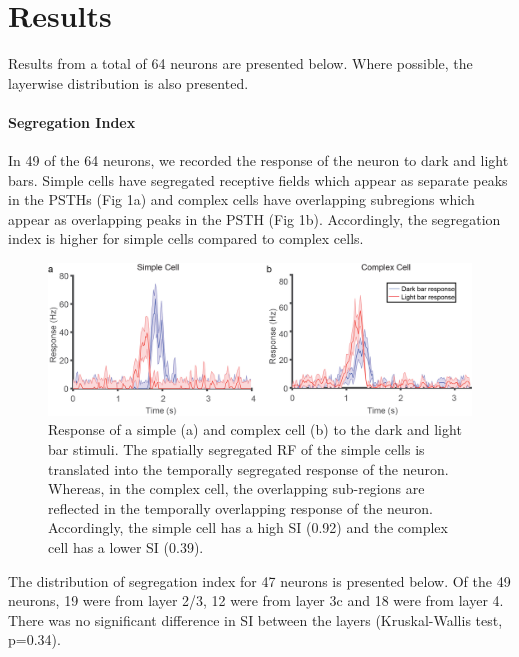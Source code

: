					

	\section{Results}
	
		Results from a total of 64 neurons are presented below. Where possible, the layerwise distribution is also presented. 
	

		
	\paragraph {Segregation Index}	
	In 49 of the 64 neurons, we recorded the response of the neuron to dark and light bars. Simple cells have segregated receptive fields which appear as separate peaks in the PSTHs (Fig 1a) and complex cells have overlapping subregions which appear as overlapping peaks in the PSTH (Fig 1b). Accordingly, the segregation index is higher for simple cells compared to complex cells.
	
		\begin{figure}[]
		
		\includegraphics[width=\linewidth]{LinearV1/simplecomplex.jpg}
		\caption{Response of a simple (a) and complex cell (b) to the dark and light bar stimuli. The spatially segregated RF of the simple cells is translated into the temporally segregated response of the neuron. Whereas, in the complex cell, the overlapping sub-regions are reflected in the temporally overlapping response of the neuron. Accordingly, the simple cell has a high SI (0.92) and the complex cell has a lower SI (0.39).}
		\label{fig:fig2}
	\end{figure}
	
	The distribution of segregation index for 47 neurons is presented below. Of the 49 neurons, 19 were from layer 2/3, 12 were from layer 3c and 18 were from layer 4. There was no significant difference in SI between the layers (Kruskal-Wallis test, p=0.34).

